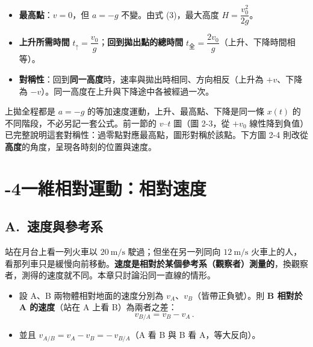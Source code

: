 \documentclass[11pt]{article}
\begin{document}
\begin{itemize}\setlength{\itemsep}{2pt}
\item \textbf{最高點}：$v=0$，但 $a=-g$ 不變。由式 (3)，最大高度 $H=\dfrac{v_0^2}{2g}$。
\item \textbf{上升所需時間} $t_{\uparrow}=\dfrac{v_0}{g}$；\textbf{回到拋出點的總時間} $t_{\text{全}}=\dfrac{2v_0}{g}$（上升、下降時間相等）。
\item \textbf{對稱性}：回到\textbf{同一高度}時，速率與拋出時相同、方向相反（上升為 $+v$、下降為 $-v$）。同一高度在上升與下降途中各被經過一次。
\end{itemize}

上拋全程都是 $a=-g$ 的等加速度運動，上升、最高點、下降是同一條 $x(t)$ 的不同階段，不必另記一套公式。前一節的 $v\text{–}t$ 圖（圖 2-3，從 $+v_0$ 線性降到負值）已完整說明這套對稱性：過零點對應最高點，圖形對稱於該點。下方圖 2-4 則改從\textbf{高度}的角度，呈現各時刻的位置與速度。


\section*{-4\quad 一維相對運動：相對速度}

\subsection*{\sffamily A.\ 速度與參考系}

站在月台上看一列火車以 $20\ \text{m/s}$ 駛過；但坐在另一列同向 $12\ \text{m/s}$ 火車上的人，看那列車只是緩慢向前移動。\textbf{速度是相對於某個參考系（觀察者）測量的}，換觀察者，測得的速度就不同。本章只討論沿同一直線的情形。

\begin{itemize}\setlength{\itemsep}{2pt}
\item 設 A、B 兩物體相對地面的速度分別為 $v_A$、$v_B$（皆帶正負號）。則 \textbf{B 相對於 A 的速度}（站在 A 上看 B）為兩者之差：
$$\boxed{\,v_{B/A} = v_B - v_A\,}.$$
\item 並且 $v_{A/B} = v_A - v_B = -\,v_{B/A}$（A 看 B 與 B 看 A，等大反向）。
\end{itemize}
\end{document}
